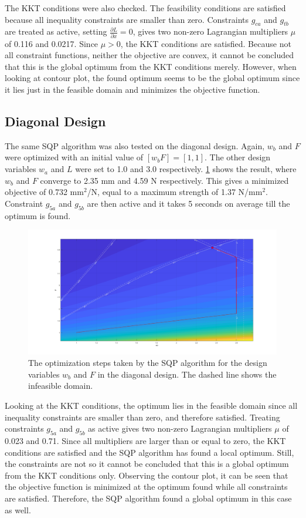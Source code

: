 The KKT conditions were also checked. 
The feasibility conditions are satisfied because all inequality constraints are smaller than zero. 
Constraints $g_{ca}$ and $g_{tb}$ are treated as active, setting $\frac{\partial L}{\partial x} = 0$, gives two non-zero Lagrangian multipliers $\mu$ of 0.116 and 0.0217. 
Since $\mu > 0$, the KKT conditions are satisfied. 
Because not all constraint functions, neither the objective are convex, it cannot be concluded that this is the global optimum from the KKT conditions merely. 
However, when looking at contour plot, the found optimum seems to be the global optimum since it lies just in the feasible domain and minimizes the objective function. 


\subsection{Diagonal Design}
The same SQP algorithm was also tested on the diagonal design. 
Again, $w_b$ and $F$ were optimized with an initial value of $[w_b F] = [1, 1]$. 
The other design variables $w_a$ and $L$ were set to 1.0 and 3.0 respectively. 
\cref{fig:diagopt} shows the result, where $w_b$ and $F$ converge to 2.35 mm and 4.59 N respectively. 
This gives a minimized objective of 0.732 mm$^2$/N, equal to a maximum strength of 1.37 N/mm$^2$. 
Constraint $g_{5a}$ and $g_{5b}$ are then active and it takes 5 seconds on average till the optimum is found.


\begin{figure}[H]
	\centering
	\includegraphics[width=\columnwidth]{../sources/plots/diagonal2var.png}
	\caption{The optimization steps taken by the SQP algorithm for the design variables $w_b$ and $F$ in the diagonal design. 
		The dashed line shows the infeasible domain.}
	\label{fig:diagopt}
\end{figure}

Looking at the KKT conditions, the optimum lies in the feasible domain since all inequality constraints are smaller than zero, and therefore satisfied. 
Treating constraints $g_{5a}$ and $g_{5b}$ as active gives two non-zero Lagrangian multipliers $\mu$ of 0.023 and 0.71. 
Since all multipliers are larger than or equal to zero, the KKT conditions are satisfied and the SQP algorithm has found a local optimum. 
Still, the constraints are not  so it cannot be concluded that this is a global optimum from the KKT conditions only. 
Observing the contour plot, it can be seen that the objective function is minimized at the optimum found while all constraints are satisfied. 
Therefore, the SQP algorithm found a global optimum in this case as well.

